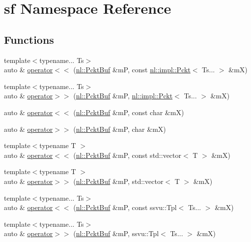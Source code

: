 \hypertarget{namespacesf}{}\section{sf Namespace Reference}
\label{namespacesf}
\subsection*{Functions}
\begin{DoxyCompactItemize}
\item 
{\footnotesize template$<$typename... Ts$>$ }\\auto \& \hyperlink{namespacesf_a0b6366da35fdc3617da9931c0f7fe7c1}{operator$<$$<$} (\hyperlink{namespacenl_a789b828a23e37a113433c2838e7c8e28}{nl\+::\+Pckt\+Buf} \&m\+P, const \hyperlink{structnl_1_1impl_1_1Pckt}{nl\+::impl\+::\+Pckt}$<$ Ts... $>$ \&m\+X)
\item 
{\footnotesize template$<$typename... Ts$>$ }\\auto \& \hyperlink{namespacesf_a203f8ccf094d398d2971fff0a7f41ba5}{operator$>$$>$} (\hyperlink{namespacenl_a789b828a23e37a113433c2838e7c8e28}{nl\+::\+Pckt\+Buf} \&m\+P, \hyperlink{structnl_1_1impl_1_1Pckt}{nl\+::impl\+::\+Pckt}$<$ Ts... $>$ \&m\+X)
\item 
auto \& \hyperlink{namespacesf_a1f57fd0e25e5641ad2d532c85d37f57f}{operator$<$$<$} (\hyperlink{namespacenl_a789b828a23e37a113433c2838e7c8e28}{nl\+::\+Pckt\+Buf} \&m\+P, const char \&m\+X)
\item 
auto \& \hyperlink{namespacesf_a531eadec32b9a608507f328ebe755aa1}{operator$>$$>$} (\hyperlink{namespacenl_a789b828a23e37a113433c2838e7c8e28}{nl\+::\+Pckt\+Buf} \&m\+P, char \&m\+X)
\item 
{\footnotesize template$<$typename T $>$ }\\auto \& \hyperlink{namespacesf_adb8e6f6f578f70bf6e506cb391674770}{operator$<$$<$} (\hyperlink{namespacenl_a789b828a23e37a113433c2838e7c8e28}{nl\+::\+Pckt\+Buf} \&m\+P, const std\+::vector$<$ T $>$ \&m\+X)
\item 
{\footnotesize template$<$typename T $>$ }\\auto \& \hyperlink{namespacesf_a0bc07b49de6b9182add9c4a2fed4e07d}{operator$>$$>$} (\hyperlink{namespacenl_a789b828a23e37a113433c2838e7c8e28}{nl\+::\+Pckt\+Buf} \&m\+P, std\+::vector$<$ T $>$ \&m\+X)
\item 
{\footnotesize template$<$typename... Ts$>$ }\\auto \& \hyperlink{namespacesf_adac59bb3200b9953977bd4d9833322a2}{operator$<$$<$} (\hyperlink{namespacenl_a789b828a23e37a113433c2838e7c8e28}{nl\+::\+Pckt\+Buf} \&m\+P, const ssvu\+::\+Tpl$<$ Ts... $>$ \&m\+X)
\item 
{\footnotesize template$<$typename... Ts$>$ }\\auto \& \hyperlink{namespacesf_a266589a003b46cb38a308b6b091885fe}{operator$>$$>$} (\hyperlink{namespacenl_a789b828a23e37a113433c2838e7c8e28}{nl\+::\+Pckt\+Buf} \&m\+P, ssvu\+::\+Tpl$<$ Ts... $>$ \&m\+X)
\end{DoxyCompactItemize}



